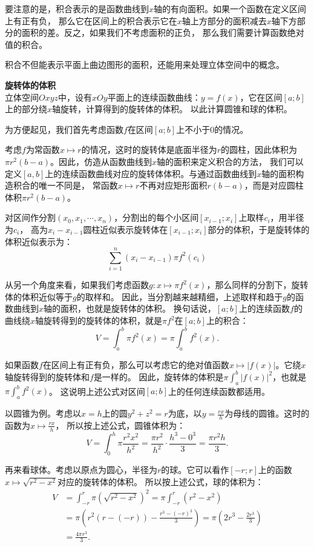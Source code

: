 \documentclass[12pt,UTF8,fontset=none]{ctexbook}
\begin{document}
要注意的是，积合表示的是函数曲线到$x$轴的有向面积。如果一个函数在定义区间上有正有负，
那么它在区间上的积合表示它在$x$轴上方部分的面积减去$x$轴下方部分的面积的差。反之，如果我们不考虑面积的正负，
那么我们需要计算函数绝对值的积合。

积合不但能表示平面上曲边图形的面积，还能用来处理立体空间中的概念。

\begin{et}{\textbf{旋转体的体积}}\\
    立体空间$Oxyz$中，设有$xOy$平面上的连续函数曲线：$y = f(x)$，它在区间$[a;b]$上的部分绕$x$轴旋转，计算得到的旋转体的体积。
    以此计算圆锥和球的体积。
\end{et}

\begin{so}
    为方便起见，我们首先考虑函数$f$在区间$[a;b]$上不小于$0$的情况。

    考虑$f$为常函数$x\mapsto r$的情况，这时的旋转体是底面半径为$r$的圆柱，因此体积为$\pi r^2 (b - a)$。因此，仿造从函数曲线到$x$轴的面积来定义积合的方法，
    我们可以定义$[a,b]$上的连续函数曲线对应的旋转体体积。与通过函数曲线到$x$轴的面积构造积合的唯一不同是，
    常函数$x\mapsto r$不再对应矩形面积$r(b - a)$，而是对应圆柱体积$\pi r^2 (b - a)$。
    
    对区间作分割$(x_0, x_1, \cdots, x_n)$，分割出的每个小区间$[x_{i-1};x_i]$上取样$c_i$，用半径为$c_i$，
    高为$x_i - x_{i-1}$圆柱近似表示旋转体在$[x_{i-1};x_i]$部分的体积，于是旋转体的体积近似表示为：
    $$ \sum_{i=1}^n (x_i - x_{i-1}) \pi f^2(c_i) $$

    从另一个角度来看，如果我们考虑函数$g: x\mapsto \pi f^2(x)$，那么同样的分割下，旋转体的体积近似等于$g$的取样和。
    因此，当分割越来越精细，上述取样和趋于$g$的函数曲线到$x$轴的面积，也就是旋转体的体积。
    换句话说，$[a;b]$上的连续函数$f$的曲线绕$x$轴旋转得到的旋转体的体积，就是$\pi f^2$在$[a;b]$上的积合：
    $$ V = \int_a^b \pi f^2(x) = \pi \int_a^b f^2(x). $$

    如果函数$f$在区间上有正有负，那么可以考虑它的绝对值函数$x\mapsto |f(x)|$。它绕$x$轴旋转得到的旋转体和$f$是一样的。
    因此，旋转体的体积是$ \pi \int_a^b |f(x)|^2$，也就是$ \pi \int_a^b f^2(x)$。
    这说明上述公式对区间$[a;b]$上的任何连续函数都适用。

    以圆锥为例。考虑以$x = h$上的圆$y^2 + z^2 = r$为底，以$y = \frac{rx}{h}$为母线的圆锥。这时的函数为$x\mapsto \frac{rx}{h}$，
    所以按上述公式，圆锥体积为：
    $$ V = \int_0^h \pi \frac{r^2x^2}{h^2} = \frac{\pi r^2}{h^2}\cdot \frac{h^3 - 0^3}{3} = \frac{\pi r^2h}{3}. $$

    再来看球体。考虑以原点为圆心，半径为$r$的球。它可以看作$[-r;r]$上的函数$x\mapsto \sqrt{r^2 - x^2}$对应的旋转体的体积。
    所以按上述公式，球的体积为：
    \begin{align*}
        V &= \int_{-r}^r \pi \left(\sqrt{r^2 - x^2}\right)^2 = \pi \int_{-r}^r \left(r^2 - x^2\right) \\
        &= \pi \left(r^2(r - (-r)) - \frac{r^3 - (-r)^3}{3}\right) = \pi \left(2r^3 - \frac{2r^3}{3}\right) \\
        &= \frac{4\pi r^3}{3}.
    \end{align*}
\end{so}
\end{document}
